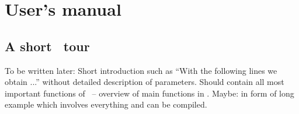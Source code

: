
\part{User's manual}
\label{part:1}

\chapter{A short \GLOBES\ tour}
\label{chapter:tour}

To be written later: Short introduction such as ``With the following lines we obtain ...''
without detailed description of parameters. Should contain all most important functions of \GLOBES\ --
overview of main functions in .
Maybe: in form of long example which involves everything
and can be compiled.

